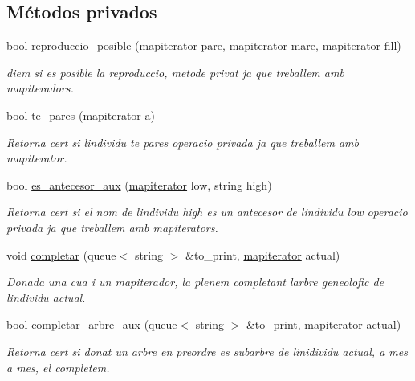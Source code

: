 \subsection*{Métodos privados}
\begin{DoxyCompactItemize}
\item 
bool \hyperlink{classpoblacio_ad8651d82e2eb8863e853d57d9b8b9985}{reproduccio\+\_\+posible} (\hyperlink{classpoblacio_a52c3d96b08f7679f27487e7499185ed1}{mapiterator} pare, \hyperlink{classpoblacio_a52c3d96b08f7679f27487e7499185ed1}{mapiterator} mare, \hyperlink{classpoblacio_a52c3d96b08f7679f27487e7499185ed1}{mapiterator} fill)
\begin{DoxyCompactList}\small\item\em diem si es posible la reproduccio, metode privat ja que treballem amb mapiteradors. \end{DoxyCompactList}\item 
bool \hyperlink{classpoblacio_a03e79690411d8ca8aa7d1e5646ca1c19}{te\+\_\+pares} (\hyperlink{classpoblacio_a52c3d96b08f7679f27487e7499185ed1}{mapiterator} a)
\begin{DoxyCompactList}\small\item\em Retorna cert si l\textquotesingle{}individu te pares operacio privada ja que treballem amb mapiterator. \end{DoxyCompactList}\item 
bool \hyperlink{classpoblacio_a068248eaa6d1090e4114e2c799c850b1}{es\+\_\+antecesor\+\_\+aux} (\hyperlink{classpoblacio_a52c3d96b08f7679f27487e7499185ed1}{mapiterator} low, string high)
\begin{DoxyCompactList}\small\item\em Retorna cert si el nom de l\textquotesingle{}individu high es un antecesor de l\textquotesingle{}individu low operacio privada ja que treballem amb mapiterator\textquotesingle{}s. \end{DoxyCompactList}\item 
void \hyperlink{classpoblacio_a90b5d501f5b346aecb3c1ba170b3fb6f}{completar} (queue$<$ string $>$ \&to\+\_\+print, \hyperlink{classpoblacio_a52c3d96b08f7679f27487e7499185ed1}{mapiterator} actual)
\begin{DoxyCompactList}\small\item\em Donada una cua i un mapiterador, la plenem completant l\textquotesingle{}arbre geneolofic de l\textquotesingle{}individu actual. \end{DoxyCompactList}\item 
bool \hyperlink{classpoblacio_a85493b733f10c8a276986a5a32404352}{completar\+\_\+arbre\+\_\+aux} (queue$<$ string $>$ \&to\+\_\+print, \hyperlink{classpoblacio_a52c3d96b08f7679f27487e7499185ed1}{mapiterator} actual)
\begin{DoxyCompactList}\small\item\em Retorna cert si donat un arbre en preordre es subarbre de l\textquotesingle{}inidividu actual, a mes a mes, el completem. \end{DoxyCompactList}\end{DoxyCompactItemize}
